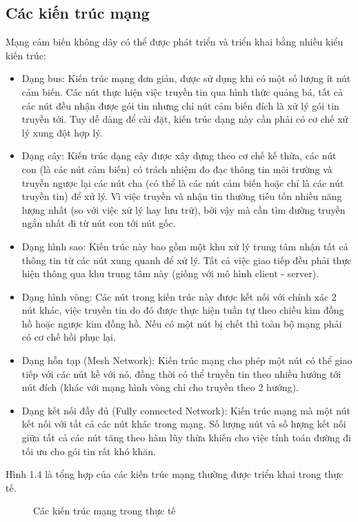 \subsection{Các kiến trúc mạng}
Mạng cảm biến không dây có thể được phát triển và triển khai bằng nhiều kiểu kiến trúc:
\begin{itemize}
\item Dạng bus: Kiến trúc mạng đơn giản, được sử dụng khi có một số lượng ít nút cảm biến. Các nút thực hiện việc truyền tin qua hình thức quảng bá, tất cả các nút đều nhận được gói tin nhưng chỉ nút cảm biến đích là xử lý gói tin truyền tới. Tuy dễ dàng để cài đặt, kiến trúc dạng này cần phải có cơ chế xử lý xung đột hợp lý.
\item Dạng cây: Kiến trúc dạng cây được xây dựng theo cơ chế kế thừa, các nút con (là các nút cảm biến) có trách nhiệm đo đạc thông tin môi trường và truyền ngược lại các nút cha (có thể là các nút cảm biến hoặc chỉ là các nút truyền tin) để xử lý. Vì việc truyền và nhận tin thường tiêu tốn nhiều năng lượng nhất (so với việc xử lý hay lưu trữ), bởi vậy mà cần tìm đường truyền ngắn nhất đi từ nút con tới nút gốc.
\item Dạng hình sao: Kiến trúc này bao gồm một khu xử lý trung tâm nhận tất cả thông tin từ các nút xung quanh để xử lý. Tất cả việc giao tiếp đều phải thực hiện thông qua khu trung tâm này (giống với mô hình client - server). 
\item Dạng hình vòng: Các nút trong kiến trúc này được kết nối với chính xác 2 nút khác, việc truyền tin do đó được thực hiện tuần tự theo chiều kim đồng hồ hoặc ngược kim đồng hồ. Nếu có một nút bị chết thì toàn bộ mạng phải có cơ chế hồi phục lại.
\item Dạng hỗn tạp (Mesh Network): Kiến trúc mạng cho phép một nút có thể giao tiếp với các nút kề với nó, đồng thời có thể truyền tin theo nhiều hướng tới nút đích (khác với mạng hình vòng chỉ cho truyền theo 2 hướng).
\item Dạng kết nối đầy đủ (Fully connected Network): Kiến trúc mạng mà một nút kết nối với tất cả các nút khác trong mạng. Số lượng nút và số lượng kết nối giữa tất cả các nút tăng theo hàm lũy thừa khiến cho việc tính toán đường đi tối ưu cho gói tin rất khó khăn.
\end{itemize}
 
Hình 1.4 là tổng hợp của các kiến trúc mạng thường được triển khai trong thực tế.


\begin{figure}[htb]
	\caption{\label{fig:my-label} Các kiến trúc mạng trong thực tế}
\end{figure}

